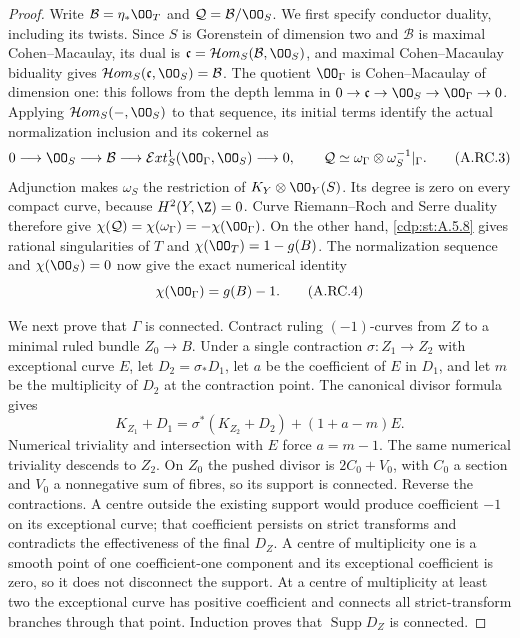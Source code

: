 \begin{proof}
Write $\mathcal B=\eta_*\OO_T$ and
$\mathcal Q=\mathcal B/\OO_S$. We first specify conductor
duality, including its twists. Since $S$ is Gorenstein of
dimension two and $\mathcal B$ is maximal Cohen--Macaulay,
its dual is $\mathfrak c=\mathcal Hom_S(\mathcal B,\OO_S)$,
and maximal Cohen--Macaulay biduality gives
$\mathcal Hom_S(\mathfrak c,\OO_S)=\mathcal B$.
The quotient $\OO_\Gamma$ is Cohen--Macaulay of dimension one:
this follows from the depth lemma in
$0\to\mathfrak c\to\OO_S\to\OO_\Gamma\to0$.
Applying $\mathcal Hom_S(-,\OO_S)$ to that sequence, its
initial terms identify the actual normalization inclusion and
its cokernel as
\[
 0\longrightarrow\OO_S\longrightarrow\mathcal B
 \longrightarrow
 \mathcal Ext^1_S(\OO_\Gamma,\OO_S)\longrightarrow0,
 \qquad
 \mathcal Q\simeq\omega_\Gamma\otimes\omega_S^{-1}|_\Gamma.
                                                               \tag{A.RC.3}\label{cdp:eq:A.RC.3}
\]
Adjunction makes $\omega_S$ the restriction of
$K_Y\otimes\OO_Y(S)$. Its degree is zero on every compact
curve, because $H^2(Y,\Z)=0$. Curve Riemann--Roch and Serre
duality therefore give
$\chi(\mathcal Q)=\chi(\omega_\Gamma)=-\chi(\OO_\Gamma)$.
On the other hand, \ref{cdp:st:A.5.8} gives rational singularities of $T$
and $\chi(\OO_T)=1-g(B)$. The normalization sequence and
$\chi(\OO_S)=0$ now give the exact numerical identity
\[
                   \chi(\OO_\Gamma)=g(B)-1.          \tag{A.RC.4}\label{cdp:eq:A.RC.4}
\]

We next prove that $\Gamma$ is connected. Contract ruling
$(-1)$-curves from $Z$ to a minimal ruled bundle $Z_0\to B$.
Under a single contraction $\sigma:Z_1\to Z_2$ with exceptional
curve $E$, let $D_2=\sigma_*D_1$, let $a$ be the coefficient
of $E$ in $D_1$, and let $m$ be the multiplicity of $D_2$ at
the contraction point. The canonical divisor formula gives
\[
 K_{Z_1}+D_1=\sigma^*(K_{Z_2}+D_2)+(1+a-m)E.
                                                               \tag{A.RC.5}\label{cdp:eq:A.RC.5}
\]
Numerical triviality and intersection with $E$ force $a=m-1$.
The same numerical triviality descends to $Z_2$. On $Z_0$
the pushed divisor is $2C_0+V_0$, with $C_0$ a section and
$V_0$ a nonnegative sum of fibres, so its support is connected.
Reverse the contractions. A centre outside the existing support
would produce coefficient $-1$ on its exceptional curve; that
coefficient persists on strict transforms and contradicts the
effectiveness of the final $D_Z$. A centre of multiplicity one
is a smooth point of one coefficient-one component and its
exceptional coefficient is zero, so it does not disconnect the
support. At a centre of multiplicity at least two the exceptional
curve has positive coefficient and connects all strict-transform
branches through that point. Induction proves that
$\operatorname{Supp}D_Z$ is connected.


\end{proof}
